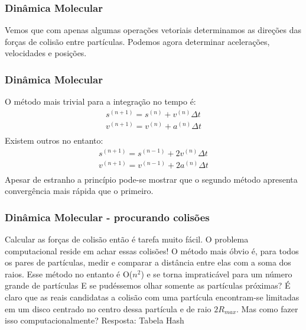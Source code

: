 \documentclass{beamer}
\begin{document}
\begin{frame}
	\frametitle{Dinâmica Molecular}
	\begin{block}{}
		Vemos que com apenas algumas operações vetoriais determinamos as direções das forças de colisão entre partículas. Podemos agora determinar acelerações, velocidades e posições.
	\end{block}
\end{frame}
\begin{frame}
	\frametitle{Dinâmica Molecular}
	 {
		O método mais trivial para a integração no tempo é:
		\begin{displaymath}
			\begin{array}{l}
			s^{(n+1)} = s^{(n)} + v^{(n)} \Delta t  	\\
			v^{(n+1)} = v^{(n)} + a^{(n)} \Delta t  	\\
			\end{array}
		\end{displaymath}			 
	 }
	 {
	Existem outros no entanto:
		\begin{displaymath}
			\begin{array}{l}
			s^{(n+1)} = s^{(n-1)} + 2 v^{(n)} \Delta t  	\\
			v^{(n+1)} = v^{(n-1)} + 2 a^{(n)} \Delta t  	\\
			\end{array}
		\end{displaymath}			 
	 }
	{
	Apesar de estranho a princípio pode-se mostrar que o segundo método apresenta convergência mais rápida que o primeiro.
	}
\end{frame}
\begin{frame}
	\frametitle{Dinâmica Molecular - procurando colisões}
	{
	Calcular as forças de colisão então é tarefa muito fácil. O problema computacional reside em achar essas colisões!	
	}
	\only<3->
	{
	O método mais óbvio é, para todos os pares de partículas, medir e comparar a distância entre elas com a soma dos raios. Esse método no entanto é O($n^2$) e se torna impraticável para um número grande de partículas	
	}	
	\only<4->
	{
	E se pudéssemos olhar somente as partículas próximas? É claro que as reais candidatas a colisão com uma partícula encontram-se limitadas em um disco centrado no centro dessa partícula e de raio $2 R_{max}$. Mas como fazer isso computacionalmente?
	}
	\only<5->
	{
	Resposta: Tabela Hash
	}		
\end{frame}
\end{document}
